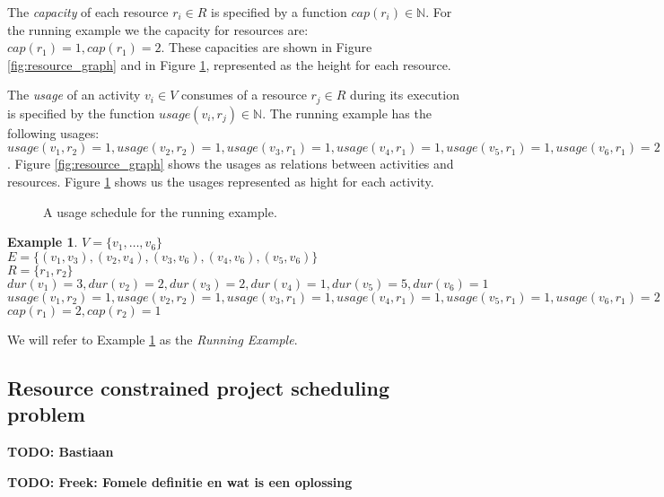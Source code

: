 \documentclass{article}
\theoremstyle{definition}
\newcommand{\TODO}[1]{{\color{red}\textbf{TODO: #1}}}
\newtheorem{example}{Example}[section]
\newcommand{\res}[0]{\ensuremath{R}} %
\newcommand{\capa}[1]{\ensuremath{cap(r_{#1})}} %
\newcommand{\dur}[1]{\ensuremath{dur(v_{#1})}} %
\newcommand{\usage}[2]{\ensuremath{usage(v_{#1}, r_{#2})}} %
\begin{document}
The \emph{capacity} of each resource $r_i \in R$ is specified by a function $\capa{i} \in \mathbb{N}$.
For the running example we the capacity for resources are: $\capa{1} = 1, \capa{1} = 2$.
These capacities are shown in Figure \ref{fig:resource_graph} and in Figure \ref{fig:usage_graph}, represented as the height for each resource.

The \emph{usage} of an activity $v_i \in V$ consumes of a resource $r_j \in \res$ during its execution is specified by the function $\usage{i}{j} \in \mathbb{N}$.
The running example has the following usages: $\usage{1}{2} = 1, \usage{2}{2} = 1, \usage{3}{1} = 1, \usage{4}{1} = 1, \usage{5}{1} = 1, \usage{6}{1} = 2$.
Figure \ref{fig:resource_graph} shows the usages as relations between activities and resources.
Figure \ref{fig:usage_graph} shows us the usages represented as hight for each activity.

\begin{figure}[h]
	\centering
	
	\caption{A usage schedule for the running example. }
	\label{fig:usage_graph}
\end{figure}

\begin{example}
\label{exmp:running}
$V = \{v_1, \ldots, v_6\}$\\
$E = \{(v_1, v_3), (v_2, v_4), (v_3, v_6), (v_4, v_6), (v_5, v_6)\}$\\
$R = \{r_1, r_2\}$\\
$\dur{1} = 3, \dur{2} = 2, \dur{3} = 2, \dur{4} = 1, \dur{5} = 5, \dur{6} = 1$\\
$\usage{1}{2} = 1, \usage{2}{2} = 1, \usage{3}{1} = 1, \usage{4}{1} = 1, \usage{5}{1} = 1, \usage{6}{1} = 2$\\
$\capa{1} = 2, \capa{2} = 1$
\end{example}
We will refer to Example \ref{exmp:running} as the \emph{Running Example}.

\subsection{Resource constrained project scheduling problem}

\TODO{Bastiaan}


\TODO{Freek: Fomele definitie en wat is een oplossing}
\end{document}
